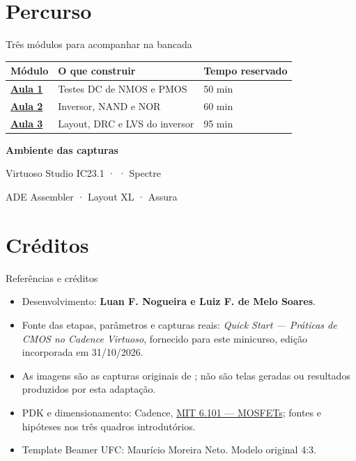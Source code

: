 \section{Percurso}
\begin{frame}{Três módulos para acompanhar na bancada}
\centering\small\begin{tabular}{lll}\toprule
Módulo & O que construir & Tempo reservado\\\midrule
\hyperlink{pratica1}{\textbf{Aula 1}} & Testes DC de NMOS e PMOS & 50 min\\[2mm]
\hyperlink{pratica2}{\textbf{Aula 2}} & Inversor, NAND e NOR & 60 min\\[2mm]
\hyperlink{pratica3}{\textbf{Aula 3}} & Layout, DRC e LVS do inversor & 95 min\\\bottomrule
\end{tabular}\par\bigskip
\textbf{Ambiente das capturas}\par
Virtuoso Studio IC23.1 ·  · Spectre\par
ADE Assembler · Layout XL · Assura
\end{frame}




\section{Créditos}
\begin{frame}{Referências e créditos}
\small\begin{itemize}
\item Desenvolvimento: \textbf{Luan F. Nogueira e Luiz F. de Melo Soares}.
\item Fonte das etapas, parâmetros e capturas reais: \textit{Quick Start — Práticas de CMOS no Cadence Virtuoso}, fornecido para este minicurso, edição incorporada em 31/10/2026.
\item As imagens são as capturas originais de ; não são telas geradas ou resultados produzidos por esta adaptação.
\item PDK e dimensionamento: Cadence, \href{https://web.mit.edu/6.101/www/s2020/handouts/L06.pdf}{MIT 6.101 — MOSFETs}; fontes e hipóteses nos três quadros introdutórios.
\item Template Beamer UFC: Maurício Moreira Neto. Modelo original 4:3.
\end{itemize}
\end{frame}

